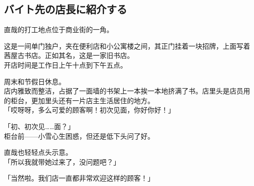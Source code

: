 \subsection{バイト先の店長に紹介する}

直哉的打工地点位于商业街的一角。

这是一间单门独户，夹在便利店和小公寓楼之间，其正门挂着一块招牌，上面写着茜屋古书店。正如其名，这是一家旧书店。\\

开店时间是工作日上午十点到下午五点。

周末和节假日休息。\\

店内雅致而整洁，占据了一面墙的书架上一本挨一本地挤满了书。店里头是店员用的柜台，更加里头还有一片店主生活居住的地方。\\

「哎呀呀，多么可爱的顾客啊！初次见面，你好你好！」

「初、初次见……面？」\\

柜台前——小雪心生困惑，但还是低下头问了好。

直哉也轻轻点头示意。\\

「所以我就带她过来了，没问题吧？」

「当然啦。我们店一直都非常欢迎这样的顾客！」\\

